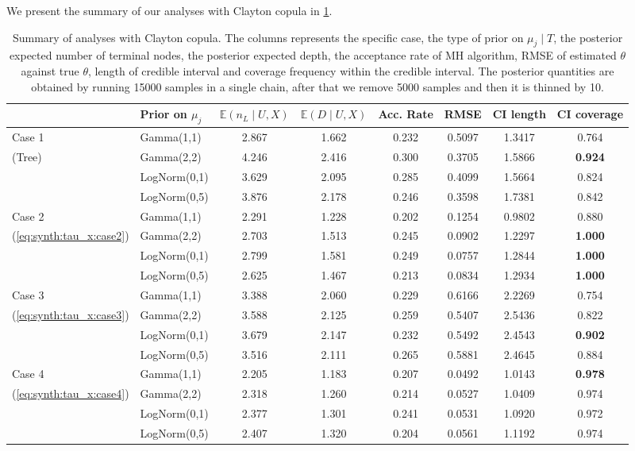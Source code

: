 \documentclass{amsart}
\begin{document}
We present the summary of our analyses with Clayton copula in \cref{tab:clayton:summary}. 


\begin{table}[ht]
	\centering
	\caption{Summary of analyses with Clayton copula. The columns represents the specific case, the type of prior on $\mu_j\mid T$, the posterior expected number of terminal nodes, the posterior expected depth, the acceptance rate of MH algorithm, RMSE of estimated $\theta$ against true $\theta$, length of credible interval and coverage frequency within the credible interval. The posterior quantities are obtained by running 15000 samples in a single chain, after that we remove 5000 samples and then it is thinned by 10.}
	\label{tab:clayton:summary}
	\scriptsize{
		\begin{tabular}{ll|cccccc}
			\toprule
			& Prior on $\mu_j$ & $\mathbb{E}(n_L\mid U,X)$ & $\mathbb{E}(D\mid U,X)$ & Acc. Rate & RMSE & CI length & CI coverage \\ 
			\midrule
			Case 1 & Gamma(1,1) & 2.867 & 1.662 & 0.232 & 0.5097 & 1.3417 & 0.764 \\ 
			(Tree) & Gamma(2,2) & 4.246 & 2.416 & 0.300 & 0.3705 & 1.5866 & \textbf{0.924} \\ 
			& LogNorm(0,1) & 3.629 & 2.095 & 0.285 & 0.4099 & 1.5664 & 0.824 \\ 
			& LogNorm(0,5) & 3.876 & 2.178 & 0.246 & 0.3598 & 1.7381 & 0.842 \\ 
			\midrule
			Case 2 & Gamma(1,1) & 2.291 & 1.228 & 0.202 & 0.1254 & 0.9802 & 0.880 \\ 
			(\cref{eq:synth:tau_x:case2}) & Gamma(2,2) & 2.703 & 1.513 & 0.245 & 0.0902 & 1.2297 & \textbf{1.000} \\ 
			& LogNorm(0,1) & 2.799 & 1.581 & 0.249 & 0.0757 & 1.2844 & \textbf{1.000} \\ 
			& LogNorm(0,5) & 2.625 & 1.467 & 0.213 & 0.0834 & 1.2934 & \textbf{1.000} \\ 
			\midrule
			Case 3 & Gamma(1,1) & 3.388 & 2.060 & 0.229 & 0.6166 & 2.2269 & 0.754 \\ 
			(\cref{eq:synth:tau_x:case3}) & Gamma(2,2) & 3.588 & 2.125 & 0.259 & 0.5407 & 2.5436 & 0.822 \\ 
			& LogNorm(0,1) & 3.679 & 2.147 & 0.232 & 0.5492 & 2.4543 & \textbf{0.902} \\ 
			& LogNorm(0,5) & 3.516 & 2.111 & 0.265 & 0.5881 & 2.4645 & 0.884 \\ 
			\midrule
			Case 4 & Gamma(1,1) & 2.205 & 1.183 & 0.207 & 0.0492 & 1.0143 & \textbf{0.978} \\ 
			(\cref{eq:synth:tau_x:case4}) & Gamma(2,2) & 2.318 & 1.260 & 0.214 & 0.0527 & 1.0409 & 0.974 \\ 
			& LogNorm(0,1) & 2.377 & 1.301 & 0.241 & 0.0531 & 1.0920 & 0.972 \\ 
			& LogNorm(0,5) & 2.407 & 1.320 & 0.204 & 0.0561 & 1.1192 & 0.974 \\ 
	\end{tabular}}
\end{table}
\end{document}
